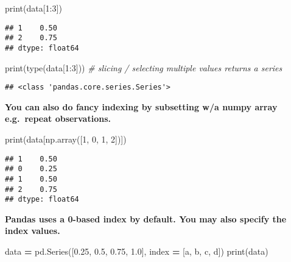 \documentclass[
]{book}
\newenvironment{Shaded}{\begin{snugshade}}{\end{snugshade}}
\newcommand{\BuiltInTok}[1]{#1}
\newcommand{\CommentTok}[1]{\textcolor[rgb]{0.56,0.35,0.01}{\textit{#1}}}
\newcommand{\DecValTok}[1]{\textcolor[rgb]{0.00,0.00,0.81}{#1}}
\newcommand{\FloatTok}[1]{\textcolor[rgb]{0.00,0.00,0.81}{#1}}
\newcommand{\NormalTok}[1]{#1}
\newcommand{\OperatorTok}[1]{\textcolor[rgb]{0.81,0.36,0.00}{\textbf{#1}}}
\newcommand{\StringTok}[1]{\textcolor[rgb]{0.31,0.60,0.02}{#1}}
\begin{document}
\begin{Shaded}
\begin{Highlighting}[]
\BuiltInTok{print}\NormalTok{(data[}\DecValTok{1}\NormalTok{:}\DecValTok{3}\NormalTok{])}
\end{Highlighting}
\end{Shaded}

\begin{verbatim}
## 1    0.50
## 2    0.75
## dtype: float64
\end{verbatim}

\begin{Shaded}
\begin{Highlighting}[]
\BuiltInTok{print}\NormalTok{(}\BuiltInTok{type}\NormalTok{(data[}\DecValTok{1}\NormalTok{:}\DecValTok{3}\NormalTok{])) }\CommentTok{\# slicing / selecting multiple values returns a series}
\end{Highlighting}
\end{Shaded}

\begin{verbatim}
## <class 'pandas.core.series.Series'>
\end{verbatim}

\textbf{You can also do fancy indexing by subsetting w/a numpy array e.g.~repeat observations.}

\begin{Shaded}
\begin{Highlighting}[]
\BuiltInTok{print}\NormalTok{(data[np.array([}\DecValTok{1}\NormalTok{, }\DecValTok{0}\NormalTok{, }\DecValTok{1}\NormalTok{, }\DecValTok{2}\NormalTok{])])}
\end{Highlighting}
\end{Shaded}

\begin{verbatim}
## 1    0.50
## 0    0.25
## 1    0.50
## 2    0.75
## dtype: float64
\end{verbatim}

\textbf{Pandas uses a 0-based index by default. You may also specify the index values.}

\begin{Shaded}
\begin{Highlighting}[]
\NormalTok{data }\OperatorTok{=}\NormalTok{ pd.Series([}\FloatTok{0.25}\NormalTok{, }\FloatTok{0.5}\NormalTok{, }\FloatTok{0.75}\NormalTok{, }\FloatTok{1.0}\NormalTok{],}
\NormalTok{index }\OperatorTok{=}\NormalTok{ [}\StringTok{\textquotesingle{}a\textquotesingle{}}\NormalTok{, }\StringTok{\textquotesingle{}b\textquotesingle{}}\NormalTok{, }\StringTok{\textquotesingle{}c\textquotesingle{}}\NormalTok{, }\StringTok{\textquotesingle{}d\textquotesingle{}}\NormalTok{])}
\BuiltInTok{print}\NormalTok{(data)}
\end{Highlighting}
\end{Shaded}
\end{document}
